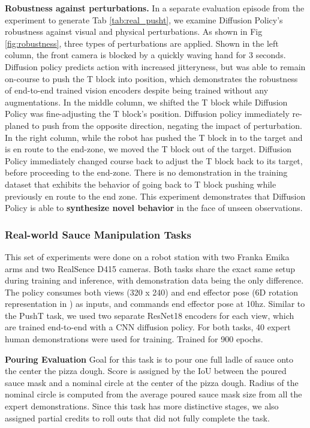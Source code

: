 \textbf{Robustness against perturbations.}
In a separate evaluation episode from the experiment to generate Tab \ref{tab:real_pusht}, we examine Diffusion Policy's robustness against visual and physical perturbations. As shown in Fig \ref{fig:robustness}, three types of perturbations are applied. Shown in the left column, the front camera is blocked by a quickly waving hand for 3 seconds. Diffusion policy predicts action with increased jitteryness, but was able to remain on-course to push the T block into position, which demonstrates the robustness of end-to-end trained vision encoders despite being trained without any augmentations. In the middle column, we shifted the T block while Diffusion Policy was fine-adjusting the T block's position. Diffusion policy immediately re-planed to push from the opposite direction, negating the impact of perturbation. In the right column, while the robot has pushed the T block in to the target and is en route to the end-zone, we moved the T block out of the target. Diffusion Policy immediately changed course back to adjust the T block back to its target, before proceeding to the end-zone. There is no demonstration in the training dataset that exhibits the behavior of going back to T block pushing while previously en route to the end zone. This experiment demonstrates that Diffusion Policy is able to \textbf{synthesize novel behavior} in the face of unseen observations.





\subsubsection{Real-world Sauce Manipulation Tasks}
This set of experiments were done on a robot station with two Franka Emika arms and two RealSence D415 cameras. Both tasks share the exact same setup during training and inference, with demonstration data being the only difference. The policy consumes both views (320 x 240) and end effector pose (6D rotation representation in \cite{zhou2019continuity}) as inputs, and commands end effector pose at 10hz. Similar to the PushT task, we used two separate ResNet18 encoders for each view, which are trained end-to-end with a CNN diffusion policy. For both tasks, 40 expert human demonstrations were used for training. Trained for 900 epochs.

\textbf{Pouring Evaluation}
Goal for this task is to pour one full ladle of sauce onto the center the pizza dough. Score is assigned by the IoU between the poured sauce mask and a nominal circle at the center of the pizza dough. Radius of the nominal circle is computed from the average poured sauce mask size from all the expert demonstrations. Since this task has more distinctive stages, we also assigned partial credits to roll outs that did not fully complete the task. 

